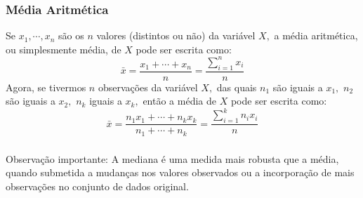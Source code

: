 \documentclass[14pt,aspectratio=1610]{beamer}
\newcommand{\bx}{\ensuremath{\bar{x}}}
\begin{document}

\begin{frame}{}
\frametitle{Média Aritmética}
\begin{block}{}
\justifying
Se $x_{1},\cdots,x_{n}$ são os $n$ valores (distintos ou não) da variável $X,$ a média aritmética, ou simplesmente média, de $X$ pode ser escrita como:
\begin{equation}
\bx=\dfrac{x_{1}+\cdots+x_{n}}{n}=\dfrac{\displaystyle \sum_{i=1}^{n}{x_{i}}}{n}
\end{equation}
Agora, se tivermos $n$ observações da variável $X,$ das quais $n_{1}$ são iguais a $x_{1},$ $n_{2}$ são iguais
a $x_{2},$ $n_{k}$ iguais a $x_{k},$ então a média de $X$ pode ser escrita como:
\begin{equation}
\bx=\dfrac{n_{1}x_{1}+\cdots+n_{k}x_{k}}{n_{1}+\cdots+n_{k}}=\dfrac{\displaystyle \sum_{i=1}^{k}n_{i}x_{i}}{n}
\end{equation}
\end{block}
\end{frame}



\begin{frame}{}
\frametitle{}
\begin{block}{Observação importante:}
\justifying
A mediana é uma medida mais robusta que a média, quando submetida a mudanças nos valores observados ou a incorporação de mais observações no conjunto de dados original.
\end{block}
\end{frame}
\end{document}

